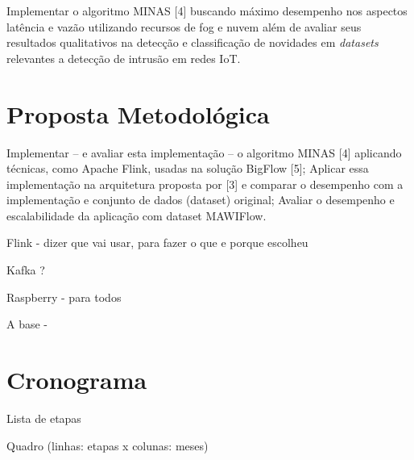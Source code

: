 Implementar o algoritmo MINAS [4] buscando máximo desempenho nos aspectos 
latência e vazão utilizando recursos de fog e nuvem além de avaliar seus resultados
qualitativos na detecção e classificação de novidades em \emph{datasets}
relevantes a detecção de intrusão em redes IoT.


\section{Proposta Metodológica}

Implementar  -- e avaliar esta implementação -- o algoritmo MINAS [4] 
aplicando técnicas, como Apache Flink, usadas na solução BigFlow [5];
Aplicar essa implementação na arquitetura proposta por [3] e
comparar o desempenho com a implementação e conjunto de dados (dataset) original;
Avaliar o desempenho e escalabilidade da aplicação com dataset MAWIFlow.

Flink  - dizer que vai usar, para fazer o que e porque escolheu 

Kafka ?

Raspberry - para todos

A base - 

\section{Cronograma}

Lista de etapas 

Quadro (linhas: etapas x colunas: meses)
